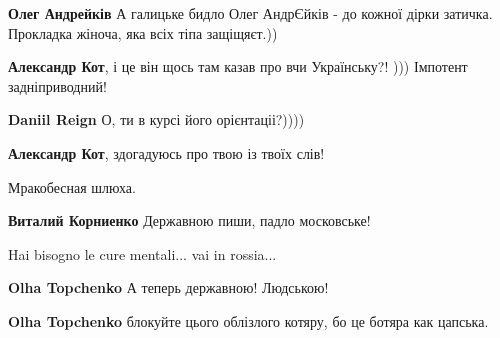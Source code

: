 \begin{itemize}
\begin{itemize}

\textbf{Олег Андрейків} А галицьке бидло Олег АндрЄйків - до кожної дірки затичка. Прокладка жіноча, яка всіх тіпа защіщяєт.))


\textbf{Александр Кот}, і це він щось там казав про вчи Українську?! )))
Імпотент задніприводний!


\textbf{Daniil Reign} О, ти в курсі його орієнтаціі?))))


\textbf{Александр Кот}, здогадуюсь про твою із твоїх слів!
\end{itemize}


Мракобесная шлюха.

\begin{itemize}

\textbf{Виталий Корниенко} Державною пиши, падло московське!
\end{itemize}


Hai bisogno le cure mentali... vai in rossia...

\begin{itemize}

\textbf{Olha Topchenko} А теперь державною! Людською!


\textbf{Olha Topchenko} блокуйте цього облізлого котяру, бо це ботяра как цапська.


\end{itemize}
\end{itemize}

